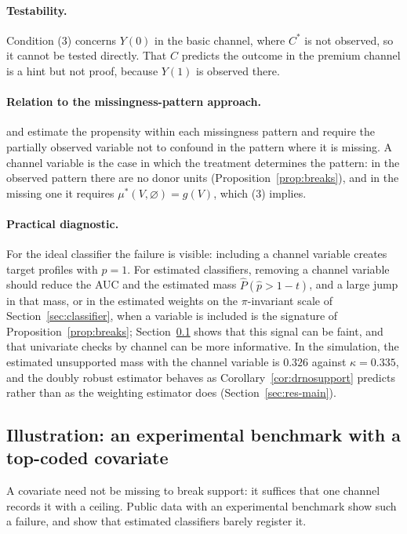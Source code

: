 \documentclass[twoside,11pt]{article}
\newcommand{\vacio}{\varnothing}
\theoremstyle{plain}
\theoremstyle{definition}
\begin{document}
\paragraph{Testability.} Condition (3) concerns $Y(0)$ in the basic channel, where $C^*$ is not observed, so it cannot be tested directly. That $C$ predicts the outcome in the premium channel is a hint but not proof, because $Y(1)$ is observed there.

\paragraph{Relation to the missingness-pattern approach.} \citet{dagostino2000} and \citet{blake2020} estimate the propensity within each missingness pattern and require the partially observed variable not to confound in the pattern where it is missing. A channel variable is the case in which the treatment determines the pattern: in the observed pattern there are no donor units (Proposition~\ref{prop:breaks}), and in the missing one it requires $\mu^*(V,\vacio)=g(V)$, which (3) implies.

\paragraph{Practical diagnostic.} For the ideal classifier the failure is visible: including a channel variable creates target profiles with $p=1$. For estimated classifiers, removing a channel variable should reduce the AUC and the estimated mass $\hat P(\hat p>1-t)$, and a large jump in that mass, or in the estimated weights on the $\pi$-invariant scale of Section~\ref{sec:classifier}, when a variable is included is the signature of Proposition~\ref{prop:breaks}; Section~\ref{sec:lalonde} shows that this signal can be faint, and that univariate checks by channel can be more informative. In the simulation, the estimated unsupported mass with the channel variable is $0.326$ against $\kappa=0.335$, and the doubly robust estimator behaves as Corollary~\ref{cor:drnosupport} predicts rather than as the weighting estimator does (Section~\ref{sec:res-main}).

\subsection{Illustration: an experimental benchmark with a top-coded covariate}\label{sec:lalonde}

A covariate need not be missing to break support: it suffices that one channel records it with a ceiling. Public data with an experimental benchmark show such a failure, and show that estimated classifiers barely register it.
\end{document}
